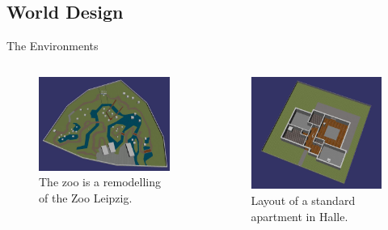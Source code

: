 \documentclass{beamer}
\begin{document}
\subsection{World Design}

\begin{frame}{The Environments}

\begin{columns}

\begin{figure}[htp]
\centering
  \includegraphics[width=\columnwidth]{images/zoo}
  \caption{The zoo is a remodelling of the Zoo Leipzig.}
\end{figure}

\begin{figure}
	\centering
	\includegraphics[width=\columnwidth]{images/apartment}
	\caption{Layout of a standard apartment in Halle.}
\end{figure}

\end{columns}

\end{frame}
\end{document}
